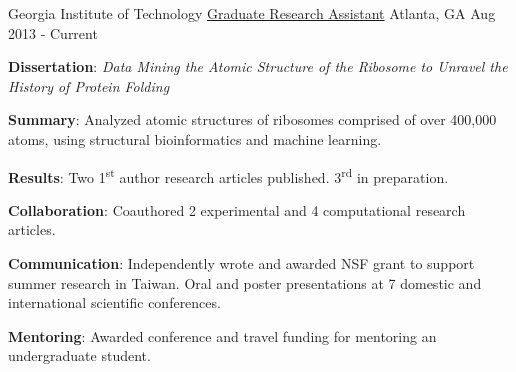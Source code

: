 

\begin{cventries}

  \cventry
    {Georgia Institute of Technology} %
    {\href{https://scholar.google.com/citations?hl=en&user=KIFFrX4AAAAJ&view_op=list_works&gmla=AJsN-F6ZS9ZeLqMG4o6JCZS87HLjoP76wA4kFValw4xx0A6ZWJJoxCWe2xu6VZvt_LgEw9YpCglVTlKY_5PfKpxiyghYFxLPNm5zrUwdBE5Fn-Sr098nt7NJGM2cH5l47IrTsSra8Vob}{Graduate Research Assistant}} %
    {Atlanta, GA} %
    {Aug 2013 - Current} %
    {{\textbf{Dissertation}: \textit{Data Mining the Atomic Structure of the Ribosome to Unravel the History of Protein Folding}}
      \begin{cvitems} %
      \vspace{4.0mm}
        \item \textbf{Summary}: Analyzed atomic structures of ribosomes comprised of over 400,000 atoms, using structural bioinformatics and machine learning. 
        \item \textbf{Results}: Two 1\textsuperscript{st} author research articles published. 3\textsuperscript{rd} in preparation.
        \item \textbf{Collaboration}: Coauthored 2 experimental and 4 computational research articles.
        \item \textbf{Communication}: Independently wrote and awarded NSF grant to support summer research in Taiwan. Oral and poster presentations at 7 domestic and international scientific conferences.
        \item \textbf{Mentoring}: Awarded conference and travel funding for mentoring an undergraduate student.
      \end{cvitems}
    }


\end{cventries}
